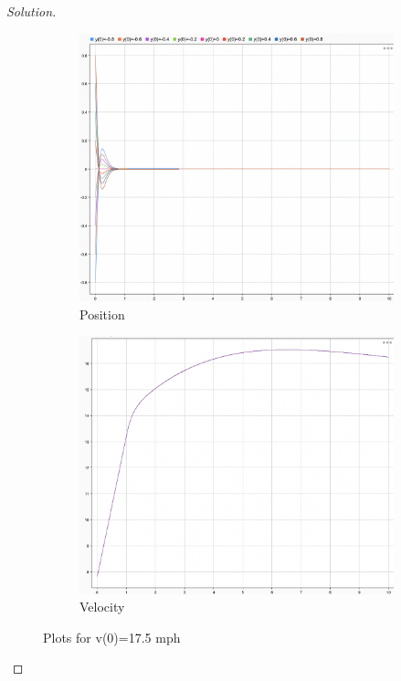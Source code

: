 \documentclass{article}
\begin{document}
\begin{proof}[Solution]
  \begin{figure}[h!]
    \centering
    \begin{subfigure}{0.4\linewidth}
      \includegraphics[width=\linewidth]{img16.png}
      \caption{Position}
    \end{subfigure}
    \begin{subfigure}{0.4\linewidth}
      \includegraphics[width=\linewidth]{img17.png}
      \caption{Velocity}
    \end{subfigure}
    \caption{Plots for v(0)=17.5 mph}
  \end{figure}
\end{proof}
\end{document}
